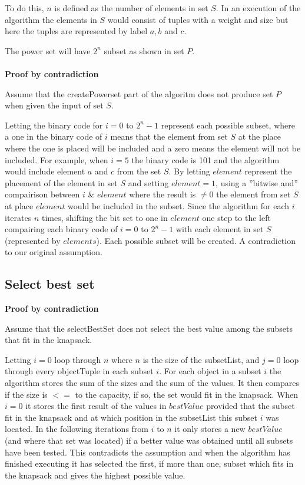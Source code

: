 \documentclass{inc/mas}
\begin{document}
To do this, $n$ is defined as the number of elements in set $S$. In an execution of the algorithm the elements in $S$ would consist of tuples with a weight and size but here the tuples are represented by label $a,b$ and $c$.

The power set will have $2^n$ subset as shown in set $P$.\\\\

\textbf{Proof by contradiction}

Assume that the createPowerset part of the algoritm does not produce set $P$ when given the input of set $S$.

Letting the binary code for $i = 0$ to $2^n-1$ represent each possible subset, where a one in the binary code of $i$ means that the element from set $S$ at the place where the one is placed will be included and a zero means the element will not be included. For example, when $i = 5$ the binary code is 101 and the algorithm would include element $a$ and $c$ from the set $S$. By letting $element$ represent the placement of the element in set $S$ and setting $element = 1$, using a ''bitwise and'' compairison between $i$ \& $element$ where the result is $\neq0$ the element from set $S$ at place $element$ would be included in the subset. Since the algorithm for each $i$ iterates $n$ times, shifting the bit set to one in $element$ one step to the left compairing each binary code of $i = 0$ to $2^n-1$ with each element in set $S$ (represented by $elements$). Each possible subset will be created. A contradiction to our original assumption.

\subsection{Select best set}

\textbf{Proof by contradiction}

Assume that the selectBestSet does not select the best value among the subsets that fit in the knapsack.

Letting $i = 0$ loop through $n$ where $n$ is the size of the subsetList, and $j = 0$ loop through every object\/Tuple in each subset $i$. For each object in a subset $i$ the algorithm stores the sum of the sizes and the sum of the values. It then compares if the size is $<=$ to the capacity, if so, the set would fit in the knapsack. When $i = 0$ it stores the first result of the values in $bestValue$ provided that the subset fit in the knapsack and at which position in the subsetList this subset $i$ was located. In the following iterations from $i$ to $n$ it only stores a new $bestValue$ (and where that set was located) if a better value was obtained until all subsets have been tested. This contradicts the assumption and when the algorithm has finished executing it has selected the first, if more than one, subset which fits in the knapsack and gives the highest possible value.
\end{document}
